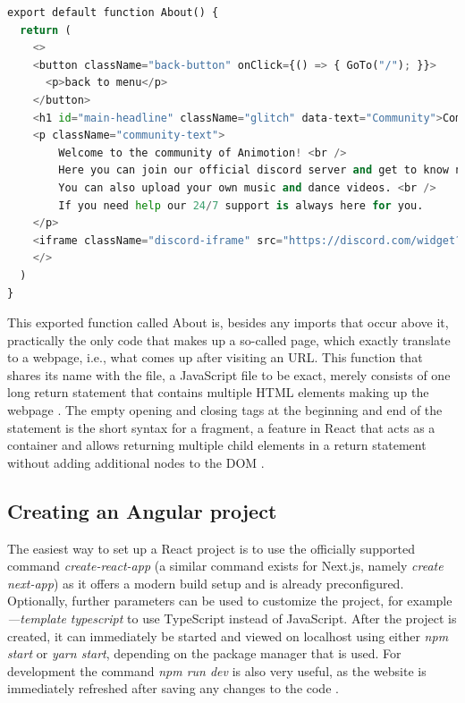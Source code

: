 \begin{lstlisting}[language=Python,caption=Example of a react component,label=lst:react]
  export default function About() {
  return (
    <>
    <button className="back-button" onClick={() => { GoTo("/"); }}>
      <p>back to menu</p>
    </button>
    <h1 id="main-headline" className="glitch" data-text="Community">Community</h1>
    <p className="community-text">
        Welcome to the community of Animotion! <br />
        Here you can join our official discord server and get to know new people. <br />
        You can also upload your own music and dance videos. <br />
        If you need help our 24/7 support is always here for you.
    </p>
    <iframe className="discord-iframe" src="https://discord.com/widget?id=1035647726634934382&theme=dark" allowtransparency="true" frameBorder="0" sandbox="allow-popups allow-popups-to-escape-sandbox allow-same-origin allow-scripts"></iframe>
    </>
  )
}
\end{lstlisting}

This exported function called About is, besides any imports that occur above it, practically the only code that makes 
up a so-called page, which exactly translate to a webpage, i.e., what comes up after visiting an URL. This function 
that shares its name with the file, a JavaScript file to be exact, merely consists of one long return statement that 
contains multiple HTML elements making up the webpage \cite{ReactJSX}.
The empty opening and closing tags at the beginning and end of the statement is the short syntax for a fragment, a 
feature in React that acts as a container and allows returning multiple child elements in a return statement 
without adding additional nodes to the DOM \cite{ReactFragments}.
\\
\subsection{Creating an Angular project}
The easiest way to set up a React project is to use the officially supported command \emph{create-react-app}
(a similar command exists for Next.js, namely \emph{create next-app}) as it offers a modern build setup and is already preconfigured. 
Optionally, further parameters can be used to customize the project, for example \emph{—template typescript} to use TypeScript 
instead of JavaScript. After the project is created, it can immediately be started and viewed on localhost using either 
\emph{npm start} or \emph{yarn start}, depending on the package manager that is used. For development the command \emph{npm run dev} is 
also very useful, as the website is immediately refreshed after saving any changes to the code \cite{create-react}.
\\
